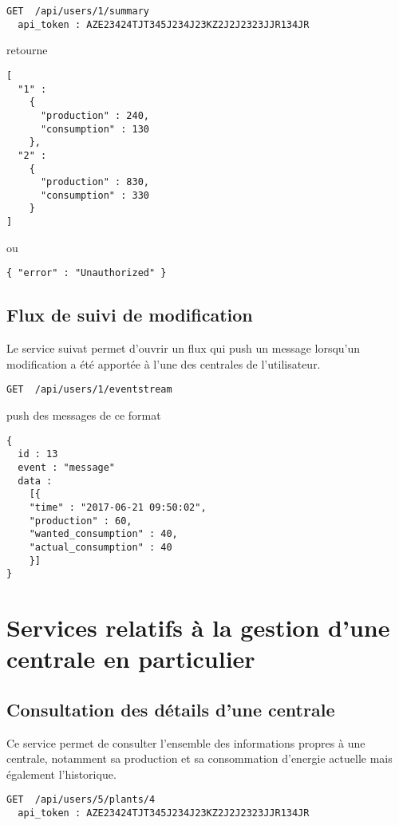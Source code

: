 \begin{lstlisting}
GET  /api/users/1/summary
  api_token : AZE23424TJT345J234J23KZ2J2J2323JJR134JR
\end{lstlisting}

retourne

\begin{lstlisting}
[
  "1" :
    { 
      "production" : 240,
      "consumption" : 130
    },
  "2" :
    { 
      "production" : 830,
      "consumption" : 330
    }
]
\end{lstlisting}

ou 

\begin{lstlisting}
{ "error" : "Unauthorized" }
\end{lstlisting}

\subsection{Flux de suivi de modification}

Le service suivat permet d'ouvrir un flux qui push un message 
lorsqu'un modification a été apportée à l'une des centrales de l'utilisateur.

\begin{lstlisting}
GET  /api/users/1/eventstream 
\end{lstlisting}

push des messages de ce format 

\begin{lstlisting}
{
  id : 13
  event : "message"
  data :
    [{
	"time" : "2017-06-21 09:50:02",
	"production" : 60,
	"wanted_consumption" : 40,
	"actual_consumption" : 40
    }]
}
\end{lstlisting}


\section{Services relatifs à la gestion d'une centrale en particulier}

\subsection{Consultation des détails d'une centrale}

Ce service permet de consulter l'ensemble des informations propres à une centrale,
notamment sa production et sa consommation d'energie actuelle mais également l'historique.

\begin{lstlisting}
GET  /api/users/5/plants/4
  api_token : AZE23424TJT345J234J23KZ2J2J2323JJR134JR
\end{lstlisting}

